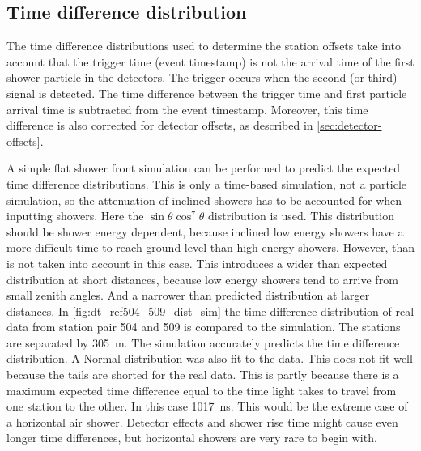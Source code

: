 \subsection{Time difference distribution}

The time difference distributions used to determine the station offsets take into account that the trigger time (event timestamp) is not the arrival time of the first shower particle in the detectors. The trigger occurs when the second (or third) signal is detected. The time difference between the trigger time and first particle arrival time is subtracted from the event timestamp. Moreover, this time difference is also corrected for detector offsets, as described in \cref{sec:detector-offsets}.

A simple flat shower front simulation can be performed to predict the expected time difference distributions. This is only a time-based simulation, not a particle simulation, so the attenuation of inclined showers has to be accounted for when inputting showers. Here the $\sin \theta \cos^7 \theta$ distribution is used. This distribution should be shower energy dependent, because inclined low energy showers have a more difficult time to reach ground level than high energy showers. However, than is not taken into account in this case. This introduces a wider than expected distribution at short distances, because low energy showers tend to arrive from small zenith angles. And a narrower than predicted distribution at larger distances. In \cref{fig:dt_ref504_509_dist_sim} the time difference distribution of real data from station pair 504 and 509 is compared to the simulation. The stations are separated by \SI{305}{\meter}. The simulation accurately predicts the time difference distribution. A Normal distribution was also fit to the data. This does not fit well because the tails are shorted for the real data. This is partly because there is a maximum expected time difference equal to the time light takes to travel from one station to the other. In this case \SI{1017}{\ns}. This would be the extreme case of a horizontal air shower. Detector effects and shower rise time might cause even longer time differences, but horizontal showers are very rare to begin with.


